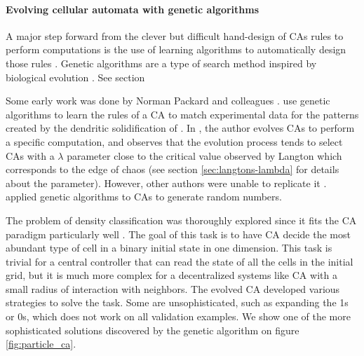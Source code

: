 \paragraph{Evolving cellular automata with genetic algorithms}
A major step forward from the clever but difficult hand-design of \acp{CA} rules
to perform computations is the use of learning algorithms to automatically
design those rules \parencite{mitchellEvolvingCellularAutomata1996}. Genetic
algorithms are a type of search method inspired by biological evolution
\parencite{bookerClassifierSystemsGenetic1989}. See section

Some early work was done by Norman Packard and colleagues
\parencite{packardAdaptationEdgeChaos1988,
  richardsExtractingCellularAutomaton1990}.
\textcite{richardsExtractingCellularAutomaton1990} use genetic algorithms to
learn the rules of a \ac{CA} to match experimental data for the patterns created
by the dendritic solidification of . In
\parencite{packardAdaptationEdgeChaos1988}, the author evolves \acp{CA} to
perform a specific computation, and observes that the evolution process tends to
select \acp{CA} with a $\lambda$ parameter close to the critical value observed
by Langton which corresponds to the edge of chaos (see section
\ref{sec:langtons-lambda} for details about the parameter). However, other
authors were unable to replicate it \parencite{mitchellRevisitingEdgeChaos1993}.
\textcite{kozaEvolutionSubsumptionUsing1992} applied genetic algorithms to
\acp{CA} to generate random numbers.

The problem of density classification was thoroughly explored since it fits the
\ac{CA} paradigm particularly well \parencite{mitchellRevisitingEdgeChaos1993,
  mitchellEvolvingCellularAutomata1994,
  crutchfieldEvolutionEmergentComputation1995, dasGeneticAlgorithmDiscovers1994,
  sipperCoevolvingNonuniformCellular1996, andreDiscoveryGeneticProgramming1996}.
The goal of this task is to have \ac{CA} decide the most abundant type of cell
in a binary initial state in one dimension. This task is trivial for a central
controller that can read the state of all the cells in the initial grid, but it
is much more complex for a decentralized systems like \ac{CA} with a small
radius of interaction with neighbors. The evolved \ac{CA} developed various
strategies to solve the task. Some are unsophisticated, such as expanding the 1s
or 0s, which does not work on all validation examples. We show one of the more
sophisticated solutions discovered by the genetic algorithm on figure
\ref{fig:particle_ca}.

